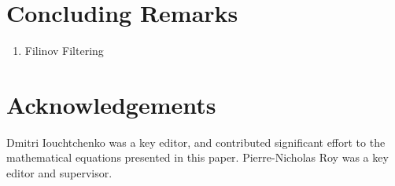 \documentclass[12pt,letterpaper,oneside,final,titlepage]{article}               %
\numberwithin{equation}{section} %
\begin{document}
\section{Concluding Remarks}
\begin{enumerate}
    \item Filinov Filtering
\end{enumerate}


\section{Acknowledgements}
Dmitri Iouchtchenko was a key editor, and contributed significant effort to the mathematical equations presented in this paper. 
Pierre-Nicholas Roy was a key editor and supervisor.

\renewcommand*{\bibfont}{\scriptsize}
\printbibliography
\end{document}
